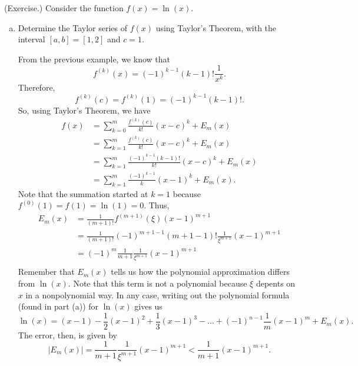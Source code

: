 \documentclass[letterpaper]{article}
\begin{document}
\begin{mdframed}
    (Exercise.) Consider the function $f(x) = \ln(x)$. 
    \begin{enumerate}[(a)]
        \item Determine the Taylor series of $f(x)$ using Taylor's Theorem, with the interval $[a, b] = [1, 2]$ and $c = 1$.
        \begin{mdframed}
            From the previous example, we know that 
            \[f^{(k)}(x) = (-1)^{k - 1} (k - 1)! \frac{1}{x^k}.\]
            Therefore, 
            \[f^{(k)}(c)  = f^{(k)}(1) = (-1)^{k - 1} (k - 1)!.\]
            So, using Taylor's Theorem, we have 
            \begin{equation*}
                \begin{aligned}
                    f(x) &= \sum_{k = 0}^{m} \frac{f^{(k)} (c)}{k!} (x - c)^k + E_{m}(x) \\ 
                        &= \sum_{k = 1}^{m} \frac{f^{(k)} (c)}{k!} (x - c)^k + E_{m}(x) \\ 
                        &= \sum_{k = 1}^{m} \frac{(-1)^{k - 1} (k - 1)!}{k!} (x - c)^k + E_{m}(x) \\ 
                        &= \sum_{k = 1}^{m} \frac{(-1)^{k - 1}}{k} (x - 1)^k + E_{m}(x).
                \end{aligned}
            \end{equation*}
            Note that the summation started at $k = 1$ because $f^{(0)}(1) = f(1) = \ln(1) = 0$. Thus, 
            \begin{equation*}
                \begin{aligned}
                    E_{m}(x) &= \frac{1}{(m + 1)!} f^{(m + 1)}(\xi) (x - 1)^{m + 1} \\ 
                        &= \frac{1}{(m + 1)!} (-1)^{m + 1 - 1} (m + 1 - 1)! \frac{1}{\xi^{m + 1}} (x - 1)^{m + 1} \\
                        &= (-1)^{m} \frac{1}{m + 1} \frac{1}{\xi^{m + 1}} (x - 1)^{m + 1} \\  
                \end{aligned}
            \end{equation*}
            Remember that $E_{m}(x)$ tells us how the polynomial approximation differs from $\ln(x)$. Note that this term is not a polynomial because $\xi$ depents on $x$ in a nonpolynomial way. In any case, writing out the polynomial formula (found in part (a)) for $\ln(x)$ gives us 
            \[\ln(x) = (x - 1) - \frac{1}{2}(x - 1)^2 + \frac{1}{3}(x - 1)^3 - \hdots + (-1)^{n - 1} \frac{1}{m}(x - 1)^m + E_{m}(x).\]
            The error, then, is given by 
            \[|E_{m}(x)| = \frac{1}{m + 1} \frac{1}{\xi^{m + 1}} (x - 1)^{m + 1} < \frac{1}{m + 1}(x - 1)^{m + 1}.\]
        \end{mdframed}
        

\end{enumerate}
\end{mdframed}
\end{document}
